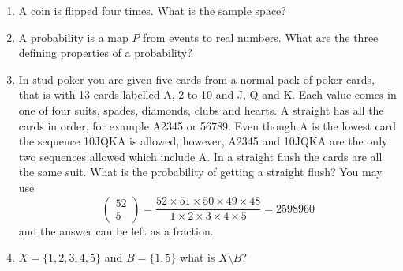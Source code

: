 \documentclass{article}
\newif\ifanswer
\begin{document}
\begin{enumerate}

\item A coin is flipped four times. What is the sample space?

  \ifanswer
  Solution: 
  $\{TTTT,TTTH,TTHT,TTHH,THTT,THTH,THHT,THHH,HTTT,HTTH,HTHT,HTHH,HHTT,HHTH,HHHT,HHHH\}$.
  \fi


\item A probability is a map $P$ from events to real numbers. What are the three defining properties of a probability?

  \ifanswer
    Solution: 
\begin{enumerate}
\item $P(A)\ge 0$ for all events.
\item $P(X)=1$
\item If $A\cap B=\emptyset$ for two events $A$ and $B$ then 
\begin{equation}
P(A\cup B)=P(A)+P(B)
\end{equation}
\end{enumerate}
where $A\cap B$ and $A\cup B$ are the intersection and union of $A$
and $B$ and $\emptyset$ is the empty set.
\fi
  
\item In stud poker you are given five cards from a normal pack of
  poker cards, that is with 13 cards labelled A, 2 to 10 and J, Q and
  K. Each value comes in one of four suits, spades, diamonds, clubs
  and hearts.  A straight has all the cards in order, for example
  A2345 or 56789. Even though A is the lowest card the sequence 10JQKA
  is allowed, however, A2345 and 10JQKA are the only two sequences
  allowed which include A. In a straight flush the cards are all the
  same suit. What is the probability of getting a straight flush? You may use
 $$
\left(\begin{array}{c}52\\5\end{array}\right)=\frac{52\times 51\times 50\times 49\times 48}{1\times 2 \times 3 \times 4\times 5}=2598960
  $$
  and the answer can be left as a fraction.

  \ifanswer
    Solution: 
    $$P=40/2598960=1/64974$$
    or if you exclude the royal flushes
    $$P=36/2598960$$
    either answer is acceptable.
  \fi

\item $X=\{1,2,3,4,5\}$ and $B=\{1,5\}$ what is $X\setminus B$?

  \ifanswer
    Solution: 
  $$x\setminus B = \{2,3,4\}$$
  \fi


\end{enumerate}
\end{document}
